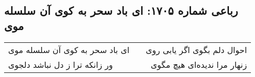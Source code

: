 \begin{center}
\section*{رباعی شماره ۱۷۰۵: ای باد سحر به کوی آن سلسله موی}
\label{sec:1705}
\begin{longtable}{l p{0.5cm} r}
ای باد سحر به کوی آن سلسله موی
&&
احوال دلم بگوی اگر یابی روی
\\
ور زانکه ترا ز دل نباشد دلجوی
&&
زنهار مرا ندیده‌ای هیچ مگوی
\\
\end{longtable}
\end{center}
